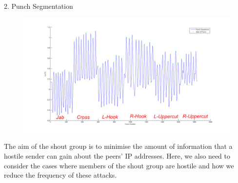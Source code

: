 \documentclass[ %
                    author={Liam O'Shea},
                supervisor={Dr. Sion Hanunna},
                     title={ZeroToHero},
                  subtitle={},
                    degree={Bsc},
                      year={2014} ]{poster}
\begin{document}
\begin{frame}{}
\begin{columns}[t]
\begin{column}{0.422\linewidth}
\begin{block}{\normalsize 2. Punch Segmentation}
    


    \begin{figure}[h]
        \includegraphics[height=0.15\textheight, width=0.35\textheight]{images/punchseq-pdf}
    \end{figure}
    The aim of the shout group is to minimise the amount of information that a hostile sender can gain about the peers' IP addresses. Here, we also need to consider the cases where members of the shout group are hostile and how we reduce the frequency of these attacks.
    \end{block}
    \end{column}
\end{columns}



\end{frame}
\end{document}
